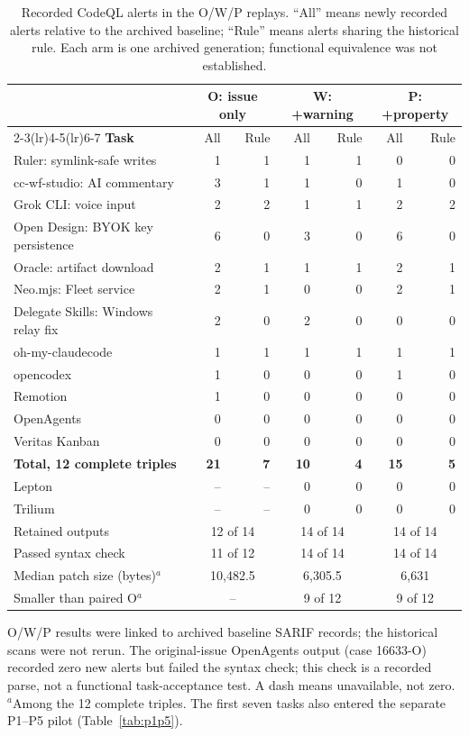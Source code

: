 \begin{table}[H]
\caption{Recorded CodeQL alerts in the O/W/P replays. ``All'' means newly recorded alerts relative to the archived baseline; ``Rule'' means alerts sharing the historical rule. Each arm is one archived generation; functional equivalence was not established.}
\label{tab:replays}
\centering\small
\begin{tabular}{@{}lrrrrrr@{}}
\toprule
& \multicolumn{2}{c}{\textbf{O: issue only}} & \multicolumn{2}{c}{\textbf{W: +warning}} & \multicolumn{2}{c}{\textbf{P: +property}}\\
\cmidrule(lr){2-3}\cmidrule(lr){4-5}\cmidrule(lr){6-7}
\textbf{Task} & All & Rule & All & Rule & All & Rule\\
\midrule
Ruler: symlink-safe writes & 1 & 1 & 1 & 1 & 0 & 0\\
cc-wf-studio: AI commentary & 3 & 1 & 1 & 0 & 1 & 0\\
Grok CLI: voice input & 2 & 2 & 1 & 1 & 2 & 2\\
Open Design: BYOK key persistence & 6 & 0 & 3 & 0 & 6 & 0\\
Oracle: artifact download & 2 & 1 & 1 & 1 & 2 & 1\\
Neo.mjs: Fleet service & 2 & 1 & 0 & 0 & 2 & 1\\
Delegate Skills: Windows relay fix & 2 & 0 & 2 & 0 & 0 & 0\\
oh-my-claudecode & 1 & 1 & 1 & 1 & 1 & 1\\
opencodex & 1 & 0 & 0 & 0 & 1 & 0\\
Remotion & 1 & 0 & 0 & 0 & 0 & 0\\
OpenAgents & 0 & 0 & 0 & 0 & 0 & 0\\
Veritas Kanban & 0 & 0 & 0 & 0 & 0 & 0\\
\midrule
\textbf{Total, 12 complete triples} & \textbf{21} & \textbf{7} & \textbf{10} & \textbf{4} & \textbf{15} & \textbf{5}\\
Lepton & -- & -- & 0 & 0 & 0 & 0\\
Trilium & -- & -- & 0 & 0 & 0 & 0\\
\midrule
Retained outputs & \multicolumn{2}{c}{12 of 14} & \multicolumn{2}{c}{14 of 14} & \multicolumn{2}{c}{14 of 14}\\
Passed syntax check & \multicolumn{2}{c}{11 of 12} & \multicolumn{2}{c}{14 of 14} & \multicolumn{2}{c}{14 of 14}\\
Median patch size (bytes)$^a$ & \multicolumn{2}{c}{10,482.5} & \multicolumn{2}{c}{6,305.5} & \multicolumn{2}{c}{6,631}\\
Smaller than paired O$^a$ & \multicolumn{2}{c}{--} & \multicolumn{2}{c}{9 of 12} & \multicolumn{2}{c}{9 of 12}\\
\bottomrule
\end{tabular}
\par\smallskip\raggedright\footnotesize O/W/P results were linked to archived baseline SARIF records; the historical scans were not rerun. The original-issue OpenAgents output (case 16633-O) recorded zero new alerts but failed the syntax check; this check is a recorded parse, not a functional task-acceptance test. A dash means unavailable, not zero. $^a$Among the 12 complete triples. The first seven tasks also entered the separate P1--P5 pilot (Table~\ref{tab:p1p5}).
\end{table}
